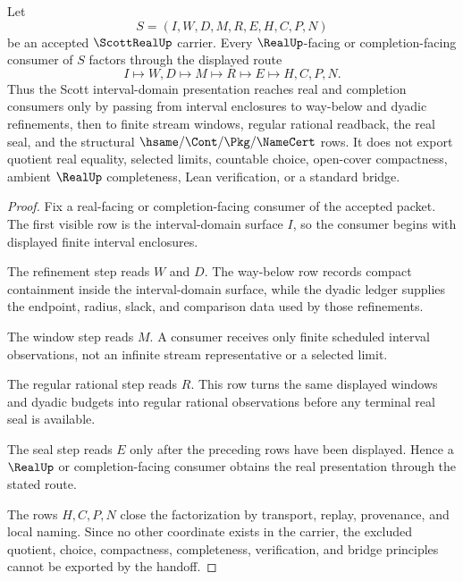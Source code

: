 \begin{theorem}
\label{thm:scott-real-interval-domain-handoff}
Let
$$
S=(I,W,D,M,R,E,H,C,P,N)
$$
be an accepted $\ScottRealUp$ carrier. Every $\RealUp$-facing or completion-facing consumer of $S$ factors through the displayed route
$$
I \longmapsto W,D \longmapsto M \longmapsto R \longmapsto E \longmapsto H,C,P,N .
$$
Thus the Scott interval-domain presentation reaches real and completion consumers only by passing from interval enclosures to way-below and dyadic refinements, then to finite stream windows, regular rational readback, the real seal, and the structural $\hsame/\Cont/\Pkg/\NameCert$ rows. It does not export quotient real equality, selected limits, countable choice, open-cover compactness, ambient $\RealUp$ completeness, Lean verification, or a standard bridge.
\end{theorem}
\begin{proof}
Fix a real-facing or completion-facing consumer of the accepted packet. The first visible row is the interval-domain surface $I$, so the consumer begins with displayed finite interval enclosures.

The refinement step reads $W$ and $D$. The way-below row records compact containment inside the interval-domain surface, while the dyadic ledger supplies the endpoint, radius, slack, and comparison data used by those refinements.

The window step reads $M$. A consumer receives only finite scheduled interval observations, not an infinite stream representative or a selected limit.

The regular rational step reads $R$. This row turns the same displayed windows and dyadic budgets into regular rational observations before any terminal real seal is available.

The seal step reads $E$ only after the preceding rows have been displayed. Hence a $\RealUp$ or completion-facing consumer obtains the real presentation through the stated route.

The rows $H,C,P,N$ close the factorization by transport, replay, provenance, and local naming. Since no other coordinate exists in the carrier, the excluded quotient, choice, compactness, completeness, verification, and bridge principles cannot be exported by the handoff.
\end{proof}


